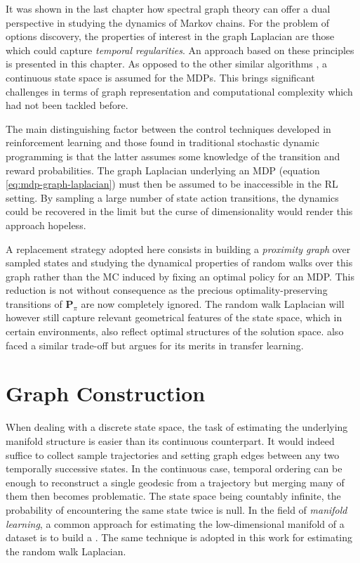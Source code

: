
It was shown in the last chapter how spectral graph theory can offer a dual perspective
in studying the dynamics of Markov chains. For the problem of options discovery, the
properties of interest in the graph Laplacian are those which could capture
\textit{temporal regularities}. An approach based on these principles is presented in this chapter. As opposed to the other similar algorithms \cite{Menache2002, Mannor2004, Mathew2012, Bouvrie2012}, a continuous state space is assumed for the MDPs. This brings significant challenges in terms of graph representation and computational complexity which had not been tackled before.

The main distinguishing factor between the control techniques developed in
reinforcement learning and those found in traditional stochastic dynamic programming
is that the latter assumes some knowledge of the transition and reward probabilities. The graph Laplacian underlying an MDP (equation \ref{eq:mdp-graph-laplacian}) must then be assumed to be inaccessible in the RL setting. By sampling a large number of state action transitions, the dynamics could be recovered in the limit but the curse of dimensionality would render this approach hopeless.

A replacement strategy adopted here consists in building a \textit{proximity graph}
over sampled states and studying the dynamical properties of random walks over this
graph rather than the MC induced by fixing an optimal policy for an MDP. This reduction is not without consequence as the precious optimality-preserving transitions of $\mathbf{P}_\pi$ are now completely ignored. The random walk Laplacian will however still capture relevant geometrical features of the state space, which in certain environments,  also reflect optimal structures of the solution space. \cite{Mahadevan2007} also faced a similar trade-off but argues for its merits in transfer learning.

\section{Graph Construction}
\label{sec:proximitygraphs}

When dealing with a discrete state space, the task of estimating the underlying manifold structure is easier than its continuous counterpart. It would indeed suffice to collect sample trajectories and setting graph edges between any two temporally successive states. In the continuous case, temporal ordering can be enough to reconstruct a single geodesic from a trajectory but merging many of them then becomes problematic. The state space being countably infinite, the probability of encountering the same state twice is null.  In the field of \textit{manifold learning}, a common approach for estimating the low-dimensional manifold of a dataset is to build a . The same technique is adopted in this work for estimating the random walk Laplacian.

